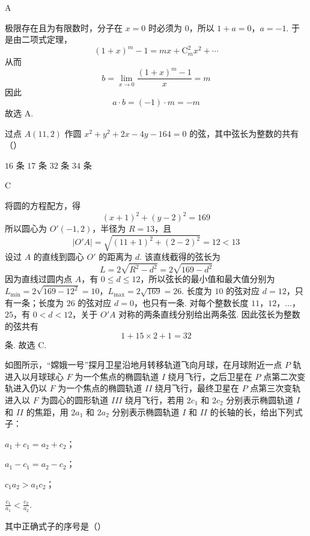 \begin{answer}
A
\end{answer}

\begin{solution}
极限存在且为有限数时，分子在 \(x=0\) 时必须为 \(0\)，所以
\(1+a=0\)，\(a=-1\).
于是由二项式定理，
\[
(1+x)^m-1=mx+\mathrm C_m^2x^2+\cdots
\]
从而
\[
b=\lim_{x\to0}\frac{(1+x)^m-1}{x}=m
\]
因此
\[
a\cdot b=(-1)\cdot m=-m
\]
故选 A.
\end{solution}

\begin{problem}
过点 \(A(11,2)\) 作圆 \(x^{2} + y^{2} + 2x - 4y - 164 = 0\) 的弦，其中弦长为整数的共有（\quad）

\choices
    {\(16\text{ 条}\)}
    {\(17\text{ 条}\)}
    {\(32\text{ 条}\)}
    {\(34\text{ 条}\)}
\end{problem}

\begin{answer}
C
\end{answer}

\begin{solution}
将圆的方程配方，得
\[
(x+1)^2+(y-2)^2=169
\]
所以圆心为 \(O'(-1,2)\)，半径为 \(R=13\)，且
\[
|O'A|=\sqrt{(11+1)^2+(2-2)^2}=12<13
\]
设过 \(A\) 的直线到圆心 \(O'\) 的距离为 \(d\). 该直线截得的弦长为
\[
L=2\sqrt{R^2-d^2}=2\sqrt{169-d^2}
\]
因为直线过圆内点 \(A\)，有 \(0\leqslant d\leqslant12\)，所以弦长的最小值和最大值分别为
\(L_{\min}=2\sqrt{169-12^2}=10\)，\(L_{\max}=2\sqrt{169}=26\).
长度为 \(10\) 的弦对应 \(d=12\)，只有一条；长度为 \(26\) 的弦对应 \(d=0\)，也只有一条. 对每个整数长度 \(11\)，\(12\)，\(\ldots\)，\(25\)，有 \(0<d<12\)，关于 \(O'A\) 对称的两条直线分别给出两条弦. 因此弦长为整数的弦共有
\[
1+15\times2+1=32
\]
条.
故选 C.
\end{solution}

\begin{problem}
如图所示，“嫦娥一号”探月卫星沿地月转移轨道飞向月球，在月球附近一点 \(P\) 轨进入以月球球心 \(F\) 为一个焦点的椭圆轨道 \(I\) 绕月飞行，之后卫星在 \(P\) 点第二次变轨进入仍以 \(F\) 为一个焦点的椭圆轨道 \(II\) 绕月飞行，最终卫星在 \(P\) 点第三次变轨进入以 \(F\) 为圆心的圆形轨道 \(III\) 绕月飞行，若用 \(2c_1\) 和 \(2c_2\) 分别表示椭圆轨道 \(I\) 和 \(II\) 的焦距，用 \(2a_1\) 和 \(2a_2\) 分别表示椭圆轨道 \(I\) 和 \(II\) 的长轴的长，给出下列式子：
\begin{circlelist}
\item \(a_1 + c_1 = a_2 + c_2\)；
\item \(a_1 - c_1 = a_2 - c_2\)；
\item \(c_1a_2 > a_1c_2\)；
\item \(\frac{c_1}{a_1} < \frac{c_2}{a_2}\).
\end{circlelist}
其中正确式子的序号是（\quad）


\choices
    {}
    {}
    {}
    {}
\end{problem}

